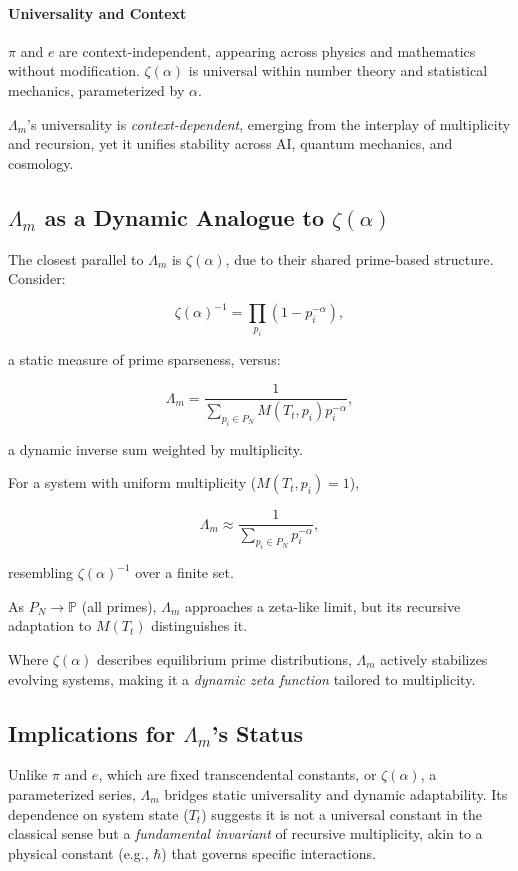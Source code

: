 \documentclass{article}
\theoremstyle{plain}
\begin{document}
\paragraph{Universality and Context}
\(\pi\) and \(e\) are context-independent, appearing across physics and mathematics without modification. \(\zeta(\alpha)\) is universal within number theory and statistical mechanics, parameterized by \(\alpha\). 

\(\Lambda_m\)'s universality is \textit{context-dependent}, emerging from the interplay of multiplicity and recursion, yet it unifies stability across AI, quantum mechanics, and cosmology.

\subsection{\(\Lambda_m\) as a Dynamic Analogue to \(\zeta(\alpha)\)}

The closest parallel to \(\Lambda_m\) is \(\zeta(\alpha)\), due to their shared prime-based structure. Consider:

\[
\zeta(\alpha)^{-1} = \prod_{p_i} (1 - p_i^{-\alpha}),
\]

a static measure of prime sparseness, versus:

\[
\Lambda_m = \frac{1}{\sum_{p_i \in P_N} M(T_t, p_i) p_i^{-\alpha}},
\]

a dynamic inverse sum weighted by multiplicity. 

For a system with uniform multiplicity (\(M(T_t, p_i) = 1\)), 

\[
\Lambda_m \approx \frac{1}{\sum_{p_i \in P_N} p_i^{-\alpha}},
\]

resembling \(\zeta(\alpha)^{-1}\) over a finite set. 

As \(P_N \to \mathbb{P}\) (all primes), \(\Lambda_m\) approaches a zeta-like limit, but its recursive adaptation to \(M(T_t)\) distinguishes it. 

Where \(\zeta(\alpha)\) describes equilibrium prime distributions, \(\Lambda_m\) actively stabilizes evolving systems, making it a \textit{dynamic zeta function} tailored to multiplicity.

\subsection{Implications for \(\Lambda_m\)'s Status}

Unlike \(\pi\) and \(e\), which are fixed transcendental constants, or \(\zeta(\alpha)\), a parameterized series, \(\Lambda_m\) bridges static universality and dynamic adaptability. Its dependence on system state (\(T_t\)) suggests it is not a universal constant in the classical sense but a \textit{fundamental invariant} of recursive multiplicity, akin to a physical constant (e.g., \(\hbar\)) that governs specific interactions.
\end{document}

